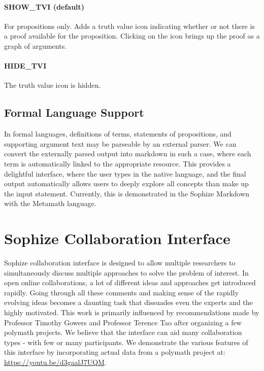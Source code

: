 \documentclass[a4paper]{article}
\begin{document}
\paragraph{SHOW\_TVI (default)}

For propositions only. Adds a truth value icon indicating whether or not there is a proof available for the proposition. Clicking on the icon brings up the proof as a graph of arguments.


\paragraph{HIDE\_TVI}

The truth value icon is hidden.


\subsection{Formal Language Support}

In formal languages, definitions of terms, statements of propositions, and supporting argument text may be parseable by an external parser. We can convert the externally parsed output into markdown in such a case, where each term is automatically linked to the appropriate resource. This provides a delightful interface, where the user types in the native language, and the final output automatically allows users to deeply explore all concepts than make up the input statement. Currently, this is demonstrated in the Sophize Markdown with the Metamath language.


\section{Sophize Collaboration Interface}

Sophize collaboration interface is designed to allow multiple researchers to simultaneously discuss multiple approaches to solve the problem of interest. In open online collaborations, a lot of different ideas and approaches get introduced rapidly. Going through all these comments and making sense of the rapidly evolving ideas becomes a daunting task that dissuades even the experts and the highly motivated. This work is primarily influenced by recommendations made by Professor Timothy Gowers and Professor Terence Tao after organizing a few polymath projects. We believe that the interface can aid many collaboration types - with few or many participants. We demonstrate the various features of this interface by incorporating actual data from a polymath project at: \url{https://youtu.be/d3gaalJ7UQM}.
\end{document}
